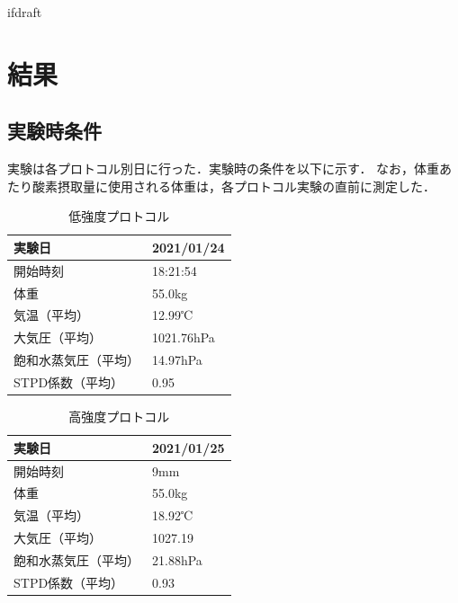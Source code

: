 \expandafter\ifx\csname ifdraft\endcsname\relax
 
\fi

\section{結果}

\subsection{実験時条件}

実験は各プロトコル別日に行った．実験時の条件を以下に示す．
なお，体重あたり酸素摂取量に使用される体重は，各プロトコル実験の直前に測定した．

\begin{table}[H]
  \begin{center}
  \caption{低強度プロトコル}
  \label{tb:light_experiment}
    \begin{tabular}{|l|l|}
      \hline
      実験日 & 2021/01/24 \\ \hline
      開始時刻 & 18:21:54 \\ \hline
      体重 & 55.0kg \\ \hline
      気温（平均） & 12.99℃ \\ \hline
      大気圧（平均） & 1021.76hPa \\ \hline
      飽和水蒸気圧（平均） & 14.97hPa　\\ \hline
      STPD係数（平均） & 0.95 \\ \hline
    \end{tabular}
  \end{center}
\end{table}

\begin{table}[H]
  \begin{center}
  \caption{高強度プロトコル}
  \label{tb:hard_experiment}
    \begin{tabular}{|l|l|}
      \hline
      実験日 & 2021/01/25 \\ \hline
      開始時刻 & 9mm \\ \hline
      体重 & 55.0kg \\ \hline
      気温（平均） & 18.92℃ \\ \hline
      大気圧（平均） & 1027.19 \\ \hline
      飽和水蒸気圧（平均） & 21.88hPa　\\ \hline
      STPD係数（平均） & 0.93 \\ \hline
    \end{tabular}
  \end{center}
\end{table}


